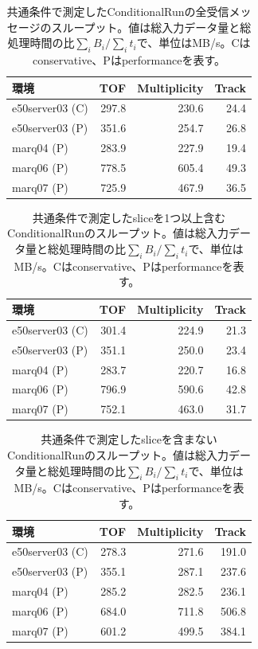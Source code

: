 \begin{table}[htbp]
  \centering
  \small
  \caption{共通条件で測定したConditionalRunの全受信メッセージのスループット。値は総入力データ量と総処理時間の比$\sum_i B_i/\sum_i t_i$で、単位はMB/s。Cはconservative、Pはperformanceを表す。}
  \label{tab:common-hlf-cond-all}
  \begin{tabular}{lrrr}
    \hline
    環境 & TOF & Multiplicity & Track \\
    \hline
    e50server03 (C) & 297.8 & 230.6 & 24.4 \\
    e50server03 (P) & 351.6 & 254.7 & 26.8 \\
    marq04 (P) & 283.9 & 227.9 & 19.4 \\
    marq06 (P) & 778.5 & 605.4 & 49.3 \\
    marq07 (P) & 725.9 & 467.9 & 36.5 \\
    \hline
  \end{tabular}
\end{table}

\begin{table}[htbp]
  \centering
  \small
  \caption{共通条件で測定したsliceを1つ以上含むConditionalRunのスループット。値は総入力データ量と総処理時間の比$\sum_i B_i/\sum_i t_i$で、単位はMB/s。Cはconservative、Pはperformanceを表す。}
  \label{tab:common-hlf-cond-has}
  \begin{tabular}{lrrr}
    \hline
    環境 & TOF & Multiplicity & Track \\
    \hline
    e50server03 (C) & 301.4 & 224.9 & 21.3 \\
    e50server03 (P) & 351.1 & 250.0 & 23.4 \\
    marq04 (P) & 283.7 & 220.7 & 16.8 \\
    marq06 (P) & 796.9 & 590.6 & 42.8 \\
    marq07 (P) & 752.1 & 463.0 & 31.7 \\
    \hline
  \end{tabular}
\end{table}

\begin{table}[htbp]
  \centering
  \small
  \caption{共通条件で測定したsliceを含まないConditionalRunのスループット。値は総入力データ量と総処理時間の比$\sum_i B_i/\sum_i t_i$で、単位はMB/s。Cはconservative、Pはperformanceを表す。}
  \label{tab:common-hlf-cond-none}
  \begin{tabular}{lrrr}
    \hline
    環境 & TOF & Multiplicity & Track \\
    \hline
    e50server03 (C) & 278.3 & 271.6 & 191.0 \\
    e50server03 (P) & 355.1 & 287.1 & 237.6 \\
    marq04 (P) & 285.2 & 282.5 & 236.1 \\
    marq06 (P) & 684.0 & 711.8 & 506.8 \\
    marq07 (P) & 601.2 & 499.5 & 384.1 \\
    \hline
  \end{tabular}
\end{table}

